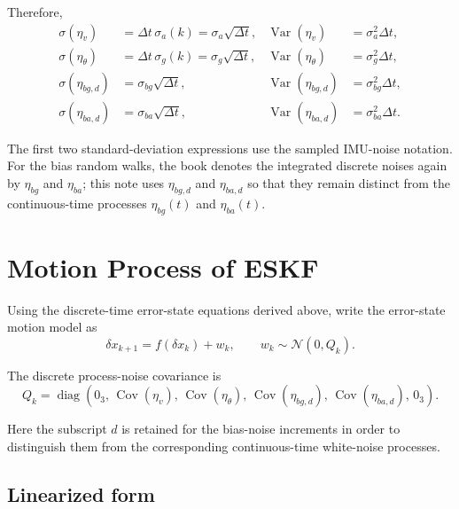 \documentclass[11pt]{article}
\numberwithin{equation}{section}
\begin{document}
Therefore,
\begin{equation}
\boxed{
\begin{aligned}
\sigma(\eta_v)
&=
\Delta t\,\sigma_a(k)
=
\sigma_a\sqrt{\Delta t},
&
\operatorname{Var}(\eta_v)
&=
\sigma_a^2\Delta t,
\\[1mm]
\sigma(\eta_\theta)
&=
\Delta t\,\sigma_g(k)
=
\sigma_g\sqrt{\Delta t},
&
\operatorname{Var}(\eta_\theta)
&=
\sigma_g^2\Delta t,
\\[1mm]
\sigma(\eta_{bg,d})
&=
\sigma_{bg}\sqrt{\Delta t},
&
\operatorname{Var}(\eta_{bg,d})
&=
\sigma_{bg}^2\Delta t,
\\[1mm]
\sigma(\eta_{ba,d})
&=
\sigma_{ba}\sqrt{\Delta t},
&
\operatorname{Var}(\eta_{ba,d})
&=
\sigma_{ba}^2\Delta t.
\end{aligned}
}
\end{equation}

The first two standard-deviation expressions use the sampled IMU-noise
notation.  For the bias random walks, the book denotes the
integrated discrete noises again by $\eta_{bg}$ and $\eta_{ba}$; this
note uses $\eta_{bg,d}$ and $\eta_{ba,d}$ so that they remain distinct
from the continuous-time processes $\eta_{bg}(t)$ and $\eta_{ba}(t)$.


\section{Motion Process of ESKF}

Using the discrete-time error-state equations derived above, write the
error-state motion model as
\begin{equation}
\boxed{
\delta x_{k+1}
=
f(\delta x_k)+w_k,
\qquad
w_k\sim\mathcal N(0,Q_k).
}
\end{equation}

The discrete process-noise covariance is
\begin{equation}
\boxed{
Q_k
=
\operatorname{diag}
\left(
0_3,\,
\operatorname{Cov}(\eta_v),\,
\operatorname{Cov}(\eta_\theta),\,
\operatorname{Cov}(\eta_{bg,d}),\,
\operatorname{Cov}(\eta_{ba,d}),\,
0_3
\right).
}
\end{equation}

Here the subscript $d$ is retained for the bias-noise increments in
order to distinguish them from the corresponding continuous-time
white-noise processes.

\subsection{Linearized form}
\end{document}
